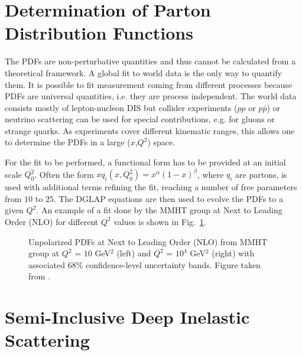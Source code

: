 
\section{Determination of Parton Distribution Functions}

The PDFs are non-perturbative quantities and thus cannot be calculated from a theoretical framework. A global fit to world data is the only way to quantify them. It is possible to fit measurement coming from different processes because PDFs are universal quantities, i.e. they are process independent. The world data consists mostly of lepton-nucleon DIS but collider experiments ($pp$ or $p\bar{p}$) or neutrino scattering can be used for special contributions, e.g. for gluons or strange quarks. As experiments cover different kinematic ranges, this allows one to determine the PDFs in a large ($x$,$Q^2$) space.

For the fit to be performed, a functional form has to be provided at an initial scale $Q^2_0$. Often the form $xq_i(x,Q^2_0) = x^{\alpha}(1-x)^{\beta}$, where $q_i$ are partons, is used with additional terms refining the fit, reaching a number of free parameters from $10$ to $25$. The DGLAP equations are then used to evolve the PDFs to a given $Q^2$. An example of a fit done by the MMHT group \cite{MMHT} at Next to Leading Order (NLO) for different $Q^2$ values is shown in Fig.~\ref{fig:MMHT}.

\begin{figure}[htb!]
\centerline{}
\caption{Unpolarized PDFs at Next to Leading Order (NLO) from MMHT group at $Q^2$ = $10$ GeV$^2$ (left) and $Q^2$ = $10^4$ GeV$^2$ (right) with associated 68\% confidence-level uncertainty bands. Figure taken from \cite{MMHT}.}\label{fig:MMHT}
\end{figure}


\section{Semi-Inclusive Deep Inelastic Scattering}

